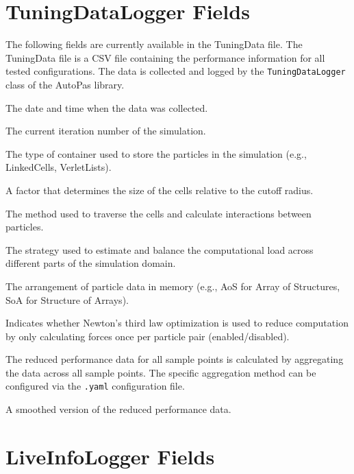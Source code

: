 \section{TuningDataLogger Fields}
\label{des:tuningdatafields}

The following fields are currently available in the TuningData file.
The TuningData file is a CSV file containing the performance information for all tested configurations. The data is collected and logged by the \texttt{TuningDataLogger} class of the AutoPas library.

\begin{description}[style=multiline, leftmargin =40mm]
  \item[Date] The date and time when the data was collected.
  \item[Iteration] The current iteration number of the simulation.
  \item[Container] The type of container used to store the particles in the simulation (e.g., LinkedCells, VerletLists).
  \item[CellSizeFactor] A factor that determines the size of the cells relative to the cutoff radius.
  \item[Traversal] The method used to traverse the cells and calculate interactions between particles.
  \item[Load Estimator] The strategy used to estimate and balance the computational load across different parts of the simulation domain.
  \item[Data Layout] The arrangement of particle data in memory (e.g., AoS for Array of Structures, SoA for Structure of Arrays).
  \item[Newton 3] Indicates whether Newton's third law optimization is used to reduce computation by only calculating forces once per particle pair (enabled/disabled).
  \item[Reduced] The reduced performance data for all sample points is calculated by aggregating the data across all sample points. The specific aggregation method can be configured via the \texttt{.yaml} configuration file.
  \item[Smoothed] A smoothed version of the reduced performance data.

\end{description}

\section{LiveInfoLogger Fields}
\label{des:liveinfodatafields}

